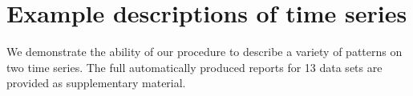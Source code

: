 \documentclass{article}
\def\eg{e.g.\ }
\begin{document}













\section{Example descriptions of time series}
\label{sec:examples}
We demonstrate the ability of our procedure to describe a variety of patterns on two time series.  The full automatically produced reports for 13 data sets are provided as supplementary material.
\end{document}
